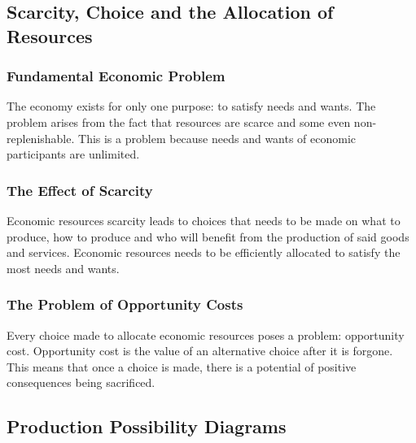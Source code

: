 \documentclass[a4paper,10pt]{article}
\begin{document}
\begin{multicols}{2}
	\subsection{Scarcity, Choice and the Allocation of Resources}
	\subsubsection{Fundamental Economic Problem}
	The economy exists for only one purpose: to satisfy needs and wants. The problem arises from the fact that resources are scarce and some even non-replenishable. This is a problem because needs and wants of economic participants are unlimited.

	\subsubsection{The Effect of Scarcity}
	Economic resources scarcity leads to choices that needs to be made on what to produce, how to produce and who will benefit from the production of said goods and services. Economic resources needs to be efficiently allocated to satisfy the most needs and wants.

	\subsubsection{The Problem of Opportunity Costs}
	Every choice made to allocate economic resources poses a problem: opportunity cost. Opportunity cost is the value of an alternative choice after it is forgone. This means that once a choice is made, there is a potential of positive consequences being sacrificed.

	\subsection{Production Possibility Diagrams}
\end{multicols}
\end{document}
